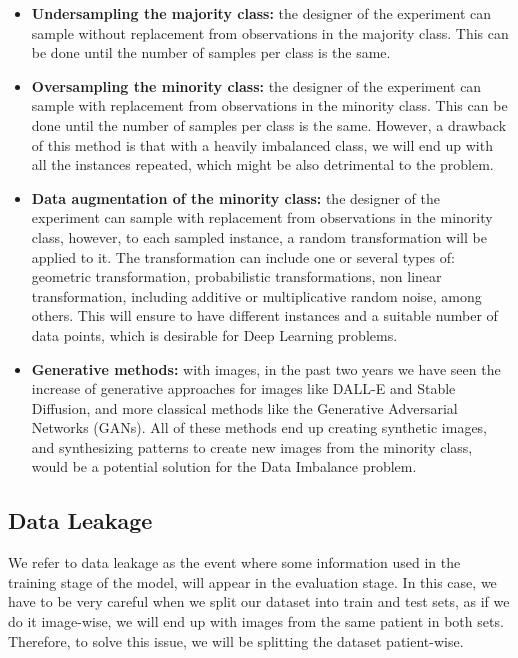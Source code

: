 \documentclass[conference]{IEEEtran}
\begin{document}
\begin{itemize}
\item \textbf{Undersampling the majority class:} the designer of the experiment can sample without replacement from observations in the majority class. This can be done until the number of samples per class is the same. 

\item \textbf{Oversampling the minority class:} the designer of the experiment can sample with replacement from observations in the minority class. This can be done until the number of samples per class is the same. However, a drawback of this method is that with a heavily imbalanced class, we will end up with all the instances repeated, which might be also detrimental to the problem.

\item \textbf{Data augmentation of the minority class:} the designer of the experiment can sample with replacement from observations in the minority class, however, to each sampled instance, a random transformation will be applied to it. The transformation can include one or several types of: geometric transformation, probabilistic transformations, non linear transformation, including additive or multiplicative random noise, among others. This will ensure to have different instances and a suitable number of data points, which is desirable for Deep Learning problems. 

\item \textbf{Generative methods: } with images, in the past two years we have seen the increase of generative approaches for images like DALL-E and Stable Diffusion, and more classical methods like the Generative Adversarial Networks (GANs). All of these methods end up creating synthetic images, and synthesizing patterns to create new images from the minority class, would be a potential solution for the Data Imbalance problem. 
\end{itemize}

\subsection{Data Leakage}

We refer to data leakage as the event where some information used in the training stage of the model, will appear in the evaluation stage. In this case, we have to be very careful when we split our dataset into train and test sets, as if we do it image-wise, we will end up with images from the same patient in both sets. Therefore, to solve this issue, we will be splitting the dataset patient-wise. 
\end{document}
